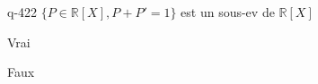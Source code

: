 \begin{truefalse}{q-422}
$\{ P \in \mathbb R[X], P+P'=1\}$ est un sous-ev de $\mathbb R[X]$
\item Vrai
\item* Faux
\end{truefalse}

